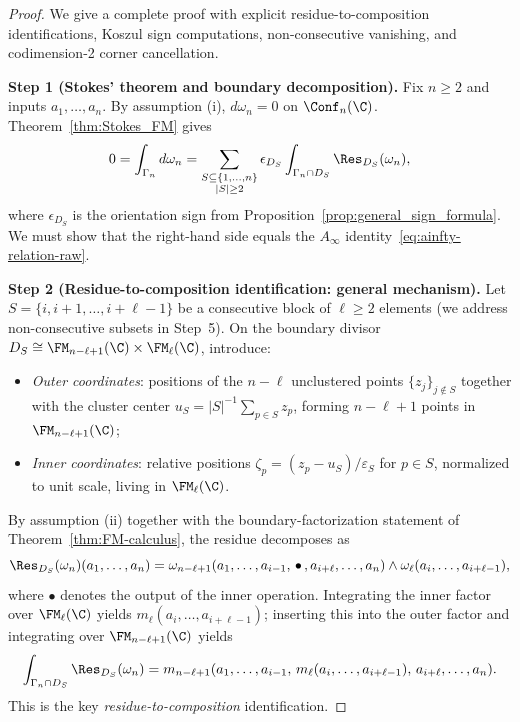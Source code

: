 \begin{proof}
We give a complete proof with explicit residue-to-composition identifications, Koszul sign computations, non-consecutive vanishing, and codimension-2 corner cancellation.

\medskip
\textbf{Step 1 (Stokes' theorem and boundary decomposition).}
Fix $n \geq 2$ and inputs $a_1,\ldots,a_n$. By assumption (i), $d\omega_n = 0$ on $\Conf_n(\C)$. Theorem~\ref{thm:Stokes_FM} gives
\begin{equation}
\label{eq:stokes-ainfty-master}
0 = \int_{\Gamma_n} d\omega_n = \sum_{\substack{S \subseteq \{1,\ldots,n\} \\ |S| \geq 2}} \epsilon_{D_S} \int_{\Gamma_n \cap D_S} \Res_{D_S}(\omega_n),
\end{equation}
where $\epsilon_{D_S}$ is the orientation sign from Proposition~\ref{prop:general_sign_formula}. We must show that the right-hand side equals the $A_\infty$ identity~\eqref{eq:ainfty-relation-raw}.

\medskip
\textbf{Step 2 (Residue-to-composition identification: general mechanism).}
Let $S = \{i, i{+}1, \ldots, i{+}\ell{-}1\}$ be a consecutive block of $\ell \geq 2$ elements (we address non-consecutive subsets in Step~5). On the boundary divisor $D_S \cong \FM_{n-\ell+1}(\C) \times \FM_\ell(\C)$, introduce:
\begin{itemize}
\item \emph{Outer coordinates}: positions of the $n - \ell$ unclustered points $\{z_j\}_{j \notin S}$ together with the cluster center $u_S = |S|^{-1}\sum_{p \in S} z_p$, forming $n - \ell + 1$ points in $\FM_{n-\ell+1}(\C)$;
\item \emph{Inner coordinates}: relative positions $\zeta_p = (z_p - u_S)/\varepsilon_S$ for $p \in S$, normalized to unit scale, living in $\FM_\ell(\C)$.
\end{itemize}
By assumption (ii) together with the boundary-factorization statement of
Theorem~\ref{thm:FM-calculus}, the residue decomposes as
\[
\Res_{D_S}(\omega_n)(a_1,\ldots,a_n) = \omega_{n-\ell+1}(a_1,\ldots,a_{i-1},\,\bullet\,,a_{i+\ell},\ldots,a_n) \wedge \omega_\ell(a_i,\ldots,a_{i+\ell-1}),
\]
where $\bullet$ denotes the output of the inner operation. Integrating the inner factor over $\FM_\ell(\C)$ yields $m_\ell(a_i,\ldots,a_{i+\ell-1})$; inserting this into the outer factor and integrating over $\FM_{n-\ell+1}(\C)$ yields
\[
\int_{\Gamma_n \cap D_S} \Res_{D_S}(\omega_n) = m_{n-\ell+1}(a_1,\ldots,a_{i-1},\, m_\ell(a_i,\ldots,a_{i+\ell-1}),\, a_{i+\ell},\ldots,a_n).
\]
This is the key \emph{residue-to-composition} identification.


\end{proof}
